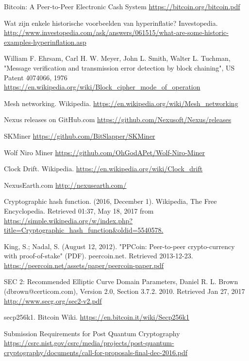 \documentclass[11pt]{article}
\begin{document}
\pagebreak
\begin{thebibliography}{7}

Bitcoin: A Peer-to-Peer Electronic Cash System \url{https://bitcoin.org/bitcoin.pdf}

Wat zijn enkele historische voorbeelden van hyperinflatie? Investopedia.
\url{http://www.investopedia.com/ask/answers/061515/what-are-some-historic-examples-hyperinflation.asp}

William F. Ehrsam, Carl H. W. Meyer, John L. Smith, Walter L. Tuchman, "Message verification and transmission error detection by block chaining", US Patent 4074066, 1976 \url{https://en.wikipedia.org/wiki/Block_cipher_mode_of_operation}

Mesh networking. Wikipedia.
\url{https://en.wikipedia.org/wiki/Mesh_networking}

Nexus releases on GitHub.com
\url{https://github.com/Nexusoft/Nexus/releases}

SKMiner
\url{https://github.com/BitSlapper/SKMiner}

Wolf Niro Miner
\url{https://github.com/OhGodAPet/Wolf-Niro-Miner}

Clock Drift. Wikipedia.
\url{https://en.wikipedia.org/wiki/Clock_drift}

NexusEarth.com
\url{http://nexusearth.com/}

Cryptographic hash function. (2016, December 1). Wikipedia, The Free Encyclopedia. Retrieved 01:37, May 18, 2017 from \url{https://simple.wikipedia.org/w/index.php?title=Cryptographic_hash_function&oldid=5540578.}

King, S.; Nadal, S. (August 12, 2012). "PPCoin: Peer-to-peer crypto-currency with proof-of-stake" (PDF). peercoin.net. Retrieved 2013-12-23. \url{https://peercoin.net/assets/paper/peercoin-paper.pdf}

SEC 2: Recommended Elliptic Curve Domain Parameters, Daniel R. L. Brown (dbrown@certicom.com), Version 2.0, Section 3.7.2. 2010. Retrieved Jan 27, 2017 \url{http://www.secg.org/sec2-v2.pdf}

secp256k1. Bitcoin Wiki.
\url{https://en.bitcoin.it/wiki/Secp256k1}

Submission Requirements for Post Quantum Cryptography
\url{https://csrc.nist.gov/csrc/media/projects/post-quantum-cryptography/documents/call-for-proposals-final-dec-2016.pdf}
 

\end{thebibliography}
\end{document}
